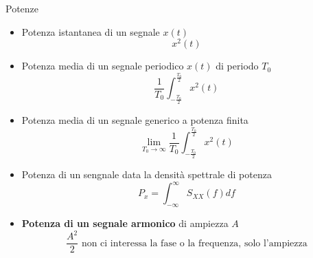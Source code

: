 \documentclass{article}
\begin{document}
Potenze
\begin{itemize}
  \item Potenza istantanea di un segnale $x(t)$ \begin{equation*}
    x^2(t)
  \end{equation*} %
    
  \item Potenza media di un segnale periodico $x(t)$ di periodo $T_0$\begin{equation*}
    \frac{1}{T_0} \int_{- \frac{T_0}{2}}^{\frac{T_0}{2}} x^2(t)
  \end{equation*}
  
  \item Potenza media di un segnale generico a potenza finita \begin{equation*}
    \lim_{T_0 \to \infty} \frac{1}{T_0} \int_{- \frac{T_0}{2}}^{\frac{T_0}{2}} x^2(t)
  \end{equation*}

  \item Potenza di un sengnale data la densità spettrale di potenza \begin{equation*}
    P_x = \int_{-\infty}^{\infty} S_{XX}(f) df
  \end{equation*}
    
  \item \textbf{Potenza di un segnale armonico} di ampiezza $A$ \begin{equation*}
    \frac{A^2}{2} \text{ non ci interessa la fase o la frequenza, solo l'ampiezza}
  \end{equation*}
\end{itemize}

\end{document}
